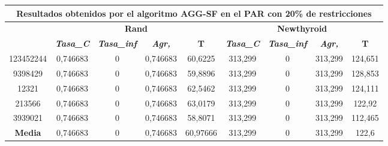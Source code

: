 \documentclass[12pt, spanish]{article}
\begin{document}
\begin{table}[H]
\footnotesize
\begin{tabular}{|c|c|c|c|c|c|c|c|c|}
\hline
\multicolumn{9}{|c|}{\textbf{Resultados obtenidos por el algoritmo AGG-SF en el PAR con 20\% de restricciones}}                                                                                                   \\ \hline
\multirow{2}{*}{} & \multicolumn{4}{c|}{\textbf{Rand}}                                                            & \multicolumn{4}{c|}{\textbf{Newthyroid}}                                                      \\ \cline{2-9} 
                  & \textit{\textbf{Tasa\_C}} & \textit{\textbf{Tasa\_inf}} & \textit{\textbf{Agr,}} & \textbf{T} & \textit{\textbf{Tasa\_C}} & \textit{\textbf{Tasa\_inf}} & \textit{\textbf{Agr,}} & \textbf{T} \\ \hline
123452244         & 0,746683                  & 0                           & 0,746683               & 60,6225    & 313,299                   & 0                           & 313,299                & 124,651    \\ \hline
9398429           & 0,746683                  & 0                           & 0,746683               & 59,8896    & 313,299                   & 0                           & 313,299                & 128,853    \\ \hline
12321             & 0,746683                  & 0                           & 0,746683               & 62,5462    & 313,299                   & 0                           & 313,299                & 124,111    \\ \hline
213566            & 0,746683                  & 0                           & 0,746683               & 63,0179    & 313,299                   & 0                           & 313,299                & 122,92     \\ \hline
3939021           & 0,746683                  & 0                           & 0,746683               & 58,8071    & 313,299                   & 0                           & 313,299                & 112,465    \\ \hline
\textbf{Media}    & 0,746683                  & 0                           & 0,746683               & 60,97666   & 313,299                   & 0                           & 313,299                & 122,6      \\ \hline
\end{tabular}
\end{table}
\end{document}
